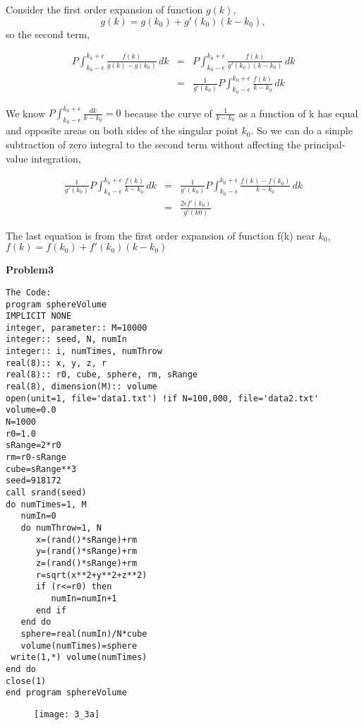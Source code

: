 \documentclass{article}
\begin{document}
Consider the first order expansion of function $g(k)$,
\[g(k)=g(k_0)+g'(k_0)(k-k_0),  \]
so the second term, 

\begin{eqnarray*}
P\int_{k_0-\epsilon}^{k_0+\epsilon} \frac{f(k)}{g(k)-g(k_0)}\,dk&=&P\int_{k_0-\epsilon}^{k_0+\epsilon} \frac{f(k)}{g'(k_0)(k-k_0)}\,dk\\
&=&\frac{1}{g'(k_0)}P\int_{k_0-\epsilon}^{k_0+\epsilon} \frac{f(k)}{k-k_0}\,dk
\end{eqnarray*}

We know $P\int_{k_0-\epsilon}^{k_0+\epsilon} \frac{dk}{k-k_0}=0$ because the curve of $\frac{1}{k-k_0}$ as a function of k has equal and opposite areas on both sides of the singular point $k_0$.  So we can do a simple subtraction of zero integral to the second term without affecting the principal-value integration,

\begin{eqnarray*}
\frac{1}{g'(k_0)}P\int_{k_0-\epsilon}^{k_0+\epsilon} \frac{f(k)}{k-k_0}\,dk&=&\frac{1}{g'(k_0)}P\int_{k_0-\epsilon}^{k_0+\epsilon} \frac{f(k)-f(k_0)}{k-k_0}\,dk\\
&=&\frac{2\epsilon f'(k_0)}{g'(k0)}
\end{eqnarray*}

The last equation is from the first order expansion of function f(k) near $k_0$, $f(k)=f(k_0)+f'(k_0)(k-k_0)$
  



\vskip 1cm


\textbf{Problem3}
\begin{verbatim}
The Code:
program sphereVolume
IMPLICIT NONE
integer, parameter:: M=10000
integer:: seed, N, numIn
integer:: i, numTimes, numThrow
real(8):: x, y, z, r 
real(8):: r0, cube, sphere, rm, sRange 
real(8), dimension(M):: volume
open(unit=1, file='data1.txt') !if N=100,000, file='data2.txt'
volume=0.0
N=1000
r0=1.0
sRange=2*r0
rm=r0-sRange
cube=sRange**3
seed=918172
call srand(seed)
do numTimes=1, M
   numIn=0  
   do numThrow=1, N
      x=(rand()*sRange)+rm
      y=(rand()*sRange)+rm
      z=(rand()*sRange)+rm
      r=sqrt(x**2+y**2+z**2)
      if (r<=r0) then
         numIn=numIn+1
      end if
   end do
   sphere=real(numIn)/N*cube
   volume(numTimes)=sphere
 write(1,*) volume(numTimes)
end do
close(1)
end program sphereVolume
\end{verbatim}

\begin{figure} [ht]
\texttt{[image: 3\_3a]}
\end{figure}
\end{document}
